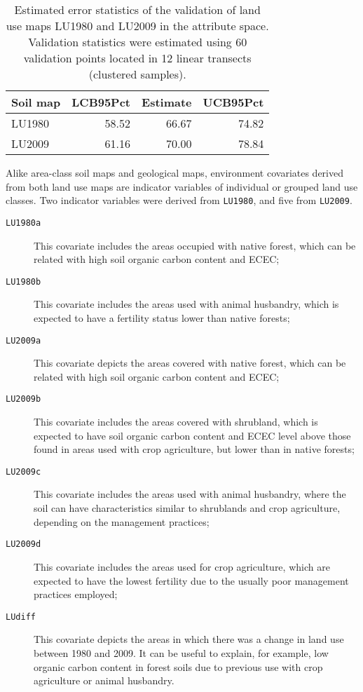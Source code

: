 \begin{table}[ht]
\caption{Estimated error statistics of the validation of land use maps LU1980 and LU2009 in the attribute space. Validation statistics were estimated using 60 validation points located in 12 linear transects (clustered samples).}
\label{tab:land-attr-val}
\centering
{\small
\begin{tabular}{lrrr}
\hline
Soil map     & LCB95Pct & Estimate & UCB95Pct \\
\hline
LU1980       & 58.52    & 66.67    & 74.82    \\
LU2009       & 61.16    & 70.00    & 78.84    \\
\hline
\end{tabular}}
\end{table}

Alike area-class soil maps and geological maps, environment covariates derived from both land use maps are indicator variables of individual or grouped land use classes. Two indicator variables were derived from \texttt{LU1980}, and five from \texttt{LU2009}.

\begin{description}
  \item[\texttt{LU1980a}] This covariate includes the areas occupied with native forest, which can be related with high soil organic carbon content and ECEC;
  
  \item[\texttt{LU1980b}] This covariate includes the areas used with animal husbandry, which is expected to have a fertility status lower than native forests;
\end{description}


\begin{description}
  \item[\texttt{LU2009a}] This covariate depicts the areas covered with native forest, which can be related with high soil organic carbon content and ECEC;
  
  \item[\texttt{LU2009b}] This covariate includes the areas covered with shrubland, which is expected to have soil organic carbon content and ECEC level above those found in areas used with crop agriculture, but lower than in native forests;
  
  \item[\texttt{LU2009c}] This covariate includes the areas used with animal husbandry, where the soil can have characteristics similar to shrublands and crop agriculture, depending on the management practices;
  
  \item[\texttt{LU2009d}] This covariate includes the areas used for crop agriculture, which are expected to have the lowest fertility due to the usually poor management practices employed;
  
  \item[\texttt{LUdiff}] This covariate depicts the areas in which there was a change in land use between 1980 and 2009. It can be useful to explain, for example, low organic carbon content in forest soils due to previous use with crop agriculture or animal husbandry.
\end{description}

